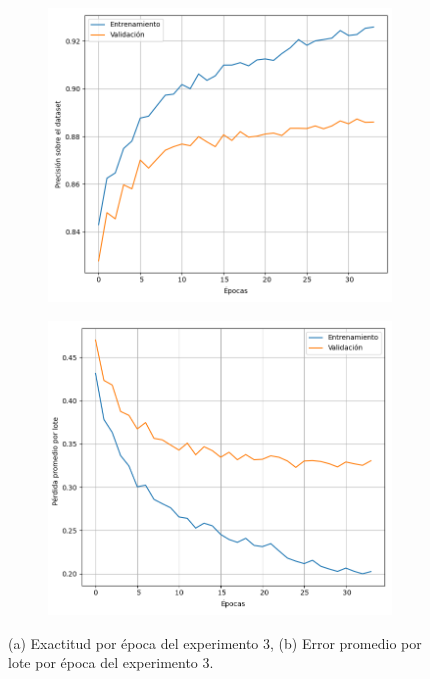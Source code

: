 \documentclass[aps,twocolumn,groupedaddress]{revtex4-2}
\begin{document}
\begin{figure}[htbp]  %
  \centering
  \begin{subfigure}[b]{0.45\textwidth}
    \centering
    \includegraphics[scale=.22]{figs/exp3/exp3_acc.png}
    \caption{}
    \label{fig:exp3_acc}
  \end{subfigure}
  \hspace{0.05\textwidth}
  \begin{subfigure}[b]{0.45\textwidth}
    \centering
    \includegraphics[scale=.22]{figs/exp3/exp3_loss.png}
    \caption{}
    \label{fig:exp3_loss}
  \end{subfigure}
  \caption{(a) Exactitud por época del experimento 3, (b) Error promedio por lote por época del experimento 3.}
  \label{fig:exp3}
\end{figure}
\end{document}
